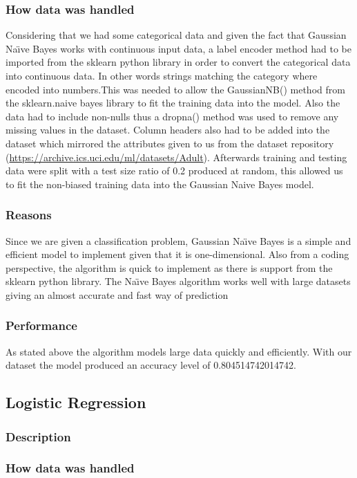 \documentclass[12pt]{article}
\begin{document}
	\subsubsection{How data was handled}
	Considering that we had some categorical data and given the fact that Gaussian Na\"{\i}ve Bayes works with continuous input data, a label encoder method had to be imported from the sklearn python library in order to convert the categorical data into continuous data. In other words strings matching the category where encoded into numbers.This was needed to allow the GaussianNB() method from the sklearn.naive bayes library to fit the training data into the model. Also the data had to include non-nulls thus a dropna() method was used to remove any missing values in the dataset. Column headers also had to be added into the dataset which mirrored the attributes given to us from the dataset repository (\url{https://archive.ics.uci.edu/ml/datasets/Adult}). Afterwards training and testing data were split with a test size ratio of 0.2 produced at random, this allowed us to fit the non-biased training data into the Gaussian Naive Bayes model.
	\subsubsection{Reasons} 
	Since we are given a classification problem, Gaussian Na\"{\i}ve Bayes is a simple and efficient model to implement given that it is one-dimensional. Also from a coding perspective, the algorithm is quick to implement as there is support from the sklearn python library. The Na\"{\i}ve Bayes algorithm works well with large datasets giving an almost accurate and fast way of prediction
	\subsubsection{Performance}
	As stated above the algorithm models large data quickly and efficiently. With our dataset the model produced an accuracy level of 0.804514742014742.  
	\newpage
	
	\subsection{Logistic Regression}
	\subsubsection{Description}
	\subsubsection{How data was handled}
\end{document}
